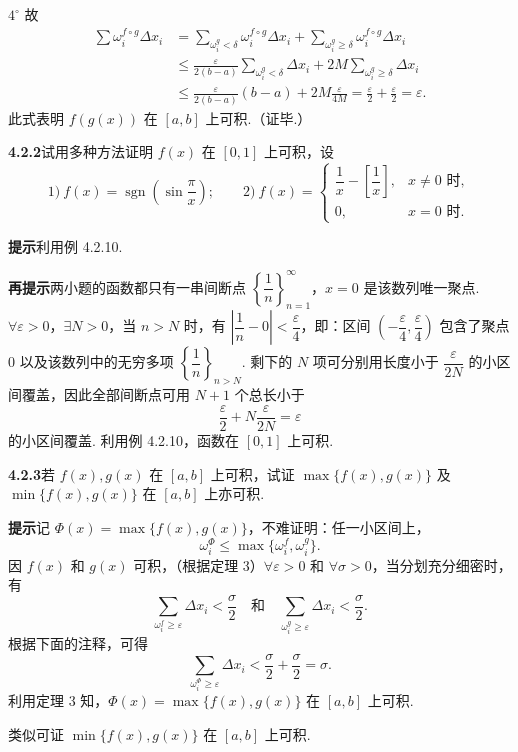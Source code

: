 \documentclass[UTF8,12pt,a4paper,fontset=fandol]{ctexart}
\begin{document}
$4^\circ$ 故
\[
\begin{aligned}
\sum\omega_i^{f\circ g}\Delta x_i
&=\sum_{\omega_i^g<\delta}\omega_i^{f\circ g}\Delta x_i
+\sum_{\omega_i^g\ge\delta}\omega_i^{f\circ g}\Delta x_i\\
&\le \frac{\varepsilon}{2(b-a)}\sum_{\omega_i^g<\delta}\Delta x_i
+2M\sum_{\omega_i^g\ge\delta}\Delta x_i\\
&\le \frac{\varepsilon}{2(b-a)}(b-a)+2M\frac{\varepsilon}{4M}
=\frac{\varepsilon}{2}+\frac{\varepsilon}{2}=\varepsilon.
\end{aligned}
\]
此式表明 $f(g(x))$ 在 $[a,b]$ 上可积.（证毕.）

\noindent\textbf{4.2.2}\quad 试用多种方法证明 $f(x)$ 在 $[0,1]$ 上可积，设
\[
1)\ f(x)=\operatorname{sgn}\left(\sin\frac{\pi}{x}\right);\qquad
2)\ f(x)=
\begin{cases}
\dfrac1x-\left[\dfrac1x\right], & x\ne0\text{ 时},\\
0, & x=0\text{ 时}.
\end{cases}
\]

\noindent\textbf{提示}\quad 利用例 4.2.10.

\noindent\textbf{再提示}\quad 两小题的函数都只有一串间断点 $\left\{\dfrac1n\right\}_{n=1}^\infty$，$x=0$ 是该数列唯一聚点. $\forall\varepsilon>0$，$\exists N>0$，当 $n>N$ 时，有 $\left|\dfrac1n-0\right|<\dfrac{\varepsilon}{4}$，即：区间 $\left(-\dfrac{\varepsilon}{4},\dfrac{\varepsilon}{4}\right)$ 包含了聚点 0 以及该数列中的无穷多项 $\left\{\dfrac1n\right\}_{n>N}$. 剩下的 $N$ 项可分别用长度小于 $\dfrac{\varepsilon}{2N}$ 的小区间覆盖，因此全部间断点可用 $N+1$ 个总长小于
\[
\frac{\varepsilon}{2}+N\frac{\varepsilon}{2N}=\varepsilon
\]
的小区间覆盖. 利用例 4.2.10，函数在 $[0,1]$ 上可积.

\noindent\textbf{4.2.3}\quad 若 $f(x),g(x)$ 在 $[a,b]$ 上可积，试证 $\max\{f(x),g(x)\}$ 及 $\min\{f(x),g(x)\}$ 在 $[a,b]$ 上亦可积.

\noindent\textbf{提示}\quad 记 $\Phi(x)=\max\{f(x),g(x)\}$，不难证明：任一小区间上，
\[
\omega_i^\Phi\le\max\{\omega_i^f,\omega_i^g\}.
\tag{1}
\]
因 $f(x)$ 和 $g(x)$ 可积，（根据定理 3）$\forall\varepsilon>0$ 和 $\forall\sigma>0$，当分划充分细密时，有
\[
\sum_{\omega_i^f\ge\varepsilon}\Delta x_i<\frac{\sigma}{2}
\quad\text{和}\quad
\sum_{\omega_i^g\ge\varepsilon}\Delta x_i<\frac{\sigma}{2}.
\]
根据下面的注释，可得
\[
\sum_{\omega_i^\Phi\ge\varepsilon}\Delta x_i<\frac{\sigma}{2}+\frac{\sigma}{2}=\sigma.
\]
利用定理 3 知，$\Phi(x)=\max\{f(x),g(x)\}$ 在 $[a,b]$ 上可积.

类似可证 $\min\{f(x),g(x)\}$ 在 $[a,b]$ 上可积.
\end{document}
